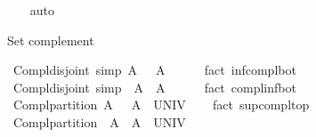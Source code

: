 \begin{isabellebody}
%
\isadelimproof
\ \ %
\endisadelimproof
%
\isatagproof
{}\isamarkupfalse%
\ auto%
\endisatagproof
{\isafoldproof}%
%
\isadelimproof
%
\endisadelimproof
%
\begin{isamarkuptext}%
\medskip Set complement%
\end{isamarkuptext}\isamarkuptrue%
\isamarkupfalse%
\ Compl{\isacharunderscore}{\kern0pt}disjoint\ {\isacharbrackleft}{\kern0pt}simp{\isacharbrackright}{\kern0pt}{\isacharcolon}{\kern0pt}\ {\isachardoublequoteopen}A\ {\isasyminter}\ {\isacharminus}{\kern0pt}\ A\ {\isacharequal}{\kern0pt}\ {\isacharbraceleft}{\kern0pt}{\isacharbraceright}{\kern0pt}{\isachardoublequoteclose}\isanewline
%
\isadelimproof
\ \ %
\endisadelimproof
%
\isatagproof
{}\isamarkupfalse%
\ {\isacharparenleft}{\kern0pt}fact\ inf{\isacharunderscore}{\kern0pt}compl{\isacharunderscore}{\kern0pt}bot{\isacharparenright}{\kern0pt}%
\endisatagproof
{\isafoldproof}%
%
\isadelimproof
\isanewline
%
\endisadelimproof
\isanewline
{}\isamarkupfalse%
\ Compl{\isacharunderscore}{\kern0pt}disjoint{}\ {\isacharbrackleft}{\kern0pt}simp{\isacharbrackright}{\kern0pt}{\isacharcolon}{\kern0pt}\ {\isachardoublequoteopen}{\isacharminus}{\kern0pt}\ A\ {\isasyminter}\ A\ {\isacharequal}{\kern0pt}\ {\isacharbraceleft}{\kern0pt}{\isacharbraceright}{\kern0pt}{\isachardoublequoteclose}\isanewline
%
\isadelimproof
\ \ %
\endisadelimproof
%
\isatagproof
{}\isamarkupfalse%
\ {\isacharparenleft}{\kern0pt}fact\ compl{\isacharunderscore}{\kern0pt}inf{\isacharunderscore}{\kern0pt}bot{\isacharparenright}{\kern0pt}%
\endisatagproof
{\isafoldproof}%
%
\isadelimproof
\isanewline
%
\endisadelimproof
\isanewline
{}\isamarkupfalse%
\ Compl{\isacharunderscore}{\kern0pt}partition{\isacharcolon}{\kern0pt}\ {\isachardoublequoteopen}A\ {\isasymunion}\ {\isacharminus}{\kern0pt}\ A\ {\isacharequal}{\kern0pt}\ UNIV{\isachardoublequoteclose}\isanewline
%
\isadelimproof
\ \ %
\endisadelimproof
%
\isatagproof
{}\isamarkupfalse%
\ {\isacharparenleft}{\kern0pt}fact\ sup{\isacharunderscore}{\kern0pt}compl{\isacharunderscore}{\kern0pt}top{\isacharparenright}{\kern0pt}%
\endisatagproof
{\isafoldproof}%
%
\isadelimproof
\isanewline
%
\endisadelimproof
\isanewline
{}\isamarkupfalse%
\ Compl{\isacharunderscore}{\kern0pt}partition{}{\isacharcolon}{\kern0pt}\ {\isachardoublequoteopen}{\isacharminus}{\kern0pt}\ A\ {\isasymunion}\ A\ {\isacharequal}{\kern0pt}\ UNIV{\isachardoublequoteclose}\isanewline
%
\isadelimproof
\ \ %
\endisadelimproof

\end{isabellebody}
